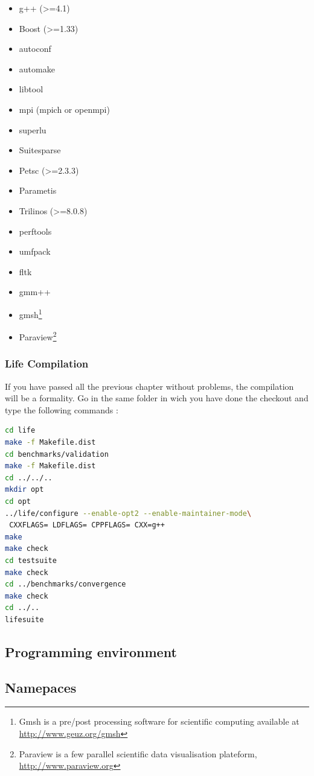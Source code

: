 \documentclass[11pt]{article}
\begin{document}
\begin{itemize}
\item g++ (>=4.1)
\item Boost (>=1.33)
\item autoconf
\item automake
\item libtool
\item mpi (mpich or openmpi)
\item superlu
\item Suitesparse
\item Petsc (>=2.3.3)
\item Parametis
\item Trilinos (>=8.0.8)
\item perftools
\item umfpack
\item fltk
\item gmm++
\item gmsh\footnote{Gmsh is a pre/post processing software for scientific
computing available at \url{http://www.geuz.org/gmsh}}
\item Paraview\footnote{Paraview is a few parallel scientific data visualisation
plateform, \url{http://www.paraview.org}}
\end{itemize}

\subsubsection{Life Compilation}
If you have passed all the previous chapter without problems, the compilation
will be a formality.
Go in the same folder in wich you have done the checkout and type the following
 commands :
\begin{lstlisting}[language=sh]
cd life
make -f Makefile.dist
cd benchmarks/validation
make -f Makefile.dist
cd ../../..
mkdir opt
cd opt
../life/configure --enable-opt2 --enable-maintainer-mode\
 CXXFLAGS= LDFLAGS= CPPFLAGS= CXX=g++
make
make check
cd testsuite
make check
cd ../benchmarks/convergence
make check
cd ../..
lifesuite
\end{lstlisting}

\subsection{Programming environment}

\subsection{Namepaces}
\end{document}
